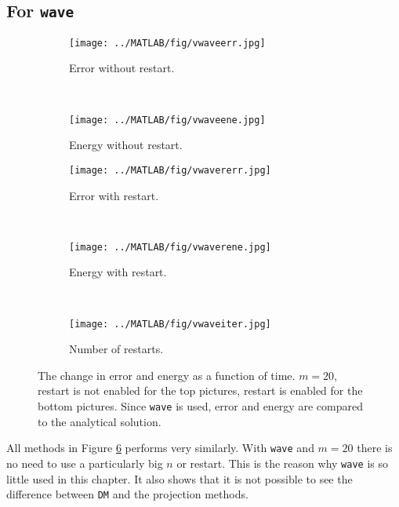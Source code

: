\subsection{For \texttt{wave}}
\begin{figure}[H]
        \centering
        \begin{subfigure}[b]{0.3\textwidth}
                \texttt{[image: ../MATLAB/fig/vwaveerr.jpg]}
                \caption{ Error without restart. }
                \label{fig:vwaveerr}
        \end{subfigure}
        ~
		\begin{subfigure}[b]{0.3\textwidth}
                \texttt{[image: ../MATLAB/fig/vwaveene.jpg]}
                \caption{ Energy without restart. }
                \label{fig:vwaveene}
        \end{subfigure}    

        \begin{subfigure}[b]{0.3\textwidth}
                \texttt{[image: ../MATLAB/fig/vwavererr.jpg]}
                \caption{ Error with restart. }
                \label{fig:vwavererr}
        \end{subfigure}
        ~
		\begin{subfigure}[b]{0.3\textwidth}
                \texttt{[image: ../MATLAB/fig/vwaverene.jpg]}
                \caption{ Energy with restart. }
                \label{fig:vwaverene}
        \end{subfigure}
        ~
		\begin{subfigure}[b]{0.3\textwidth}
                \texttt{[image: ../MATLAB/fig/vwaveiter.jpg]}
                \caption{ Number of restarts. }
                \label{fig:vwaveiter}
        \end{subfigure}        
        
        \caption{ The change in error and energy as a function of time. $m = 20$, restart is not enabled for the top pictures, restart is enabled for the bottom pictures. Since \texttt{wave} is used, error and energy are compared to the analytical solution. }
        \label{fig:vwave}
\end{figure}
All methods in Figure \ref{fig:vwave} performs very similarly. With \texttt{wave} and $m = 20$ there is no need to use a particularly big $n$ or restart. This is the reason why \texttt{wave} is so little used in this chapter. It also shows that it is not possible to see the difference between \texttt{DM} and the projection methods.%

